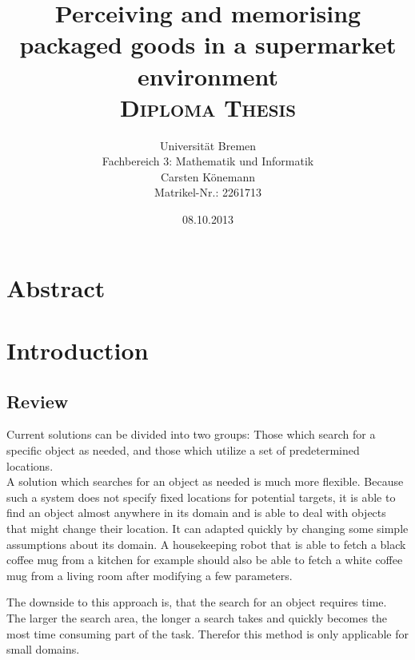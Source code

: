 \documentclass[11pt, twoside, a4paper]{report}
\begin{document}
\title{\textbf{Perceiving and memorising packaged goods in a supermarket environment} \vspace{7.5mm} \\ \textsc{Diploma Thesis}}
\author{Universit\"at Bremen \\ Fachbereich 3: Mathematik und Informatik \vspace{3.5mm} \\ Carsten K\"onemann \\ Matrikel-Nr.: 2261713}
\date{08.10.2013}

\maketitle

\chapter*{Abstract}


\tableofcontents

\chapter{Introduction}


\section{Review}
Current solutions can be divided into two groups: Those which search for a specific object as needed, and those which utilize a set of predetermined locations. \\

A solution which searches for an object as needed is much more flexible. Because such a system does not specify fixed locations for potential targets, it is able to find an object almost anywhere in its domain and is able to deal with objects that might change their location. It can adapted quickly by changing some simple assumptions about its domain. A housekeeping robot that is able to fetch a black coffee mug from a kitchen for example should also be able to fetch a white coffee mug from a living room after modifying a few parameters.

The downside to this approach is, that the search for an object requires time. The larger the search area, the longer a search takes and quickly becomes the most time consuming part of the task. Therefor this method is only applicable for small domains. \\
\end{document}
